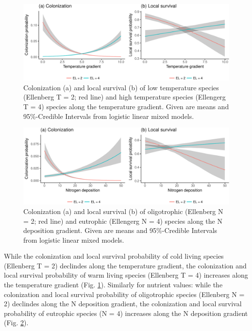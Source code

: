 \documentclass[fleqn,10pt,lineno]{wlpeerj} %
\begin{document}
\begin{figure}
\includegraphics[width=1\linewidth]{Manuscript_files/figure-latex/Teff-1} \caption{Colonization (a) and local survival (b) of low temperature species (Ellenberg T = 2; red line) and high temperature species (Ellengerg T = 4) species along the temperature gradient. Given are means and 95\%-Credible Intervals from logistic linear mixed models.}\label{fig:Teff}
\end{figure}

\begin{figure}
\includegraphics[width=1\linewidth]{Manuscript_files/figure-latex/Neff-1} \caption{Colonization (a) and local survival (b) of oligotrophic (Ellenberg N = 2; red line) and eutrophic (Ellengerg N = 4) species along the N deposition gradient. Given are means and 95\%-Credible Intervals from logistic linear mixed models.}\label{fig:Neff}
\end{figure}

While the colonization and local survival probability of cold living
species (Ellenberg T = 2) declindes along the temperature gradient, the
colonization and local survival probability of warm living species
(Ellenberg T = 4) increases along the temperature gradient (Fig.
\ref{fig:Teff}). Similarly for nutrient values: while the colonization
and local survival probability of oligotrophic species (Ellenberg N = 2)
declindes along the N deposition gradient, the colonization and local
survival probability of eutrophic species (N = 4) increases along the N
deposition gradient (Fig. \ref{fig:Neff}).
\end{document}

